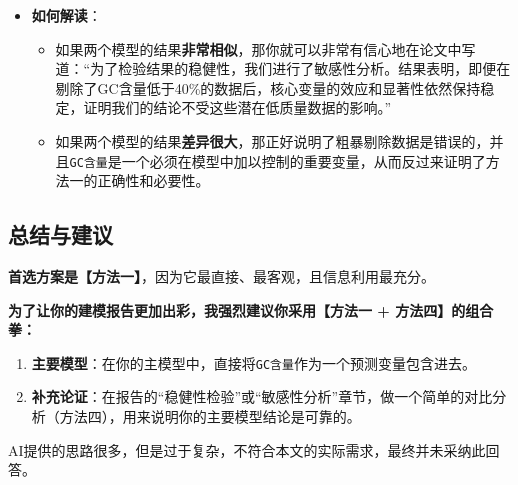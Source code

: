 \documentclass[a4paper, oneside, 12pt]{article}
\newcommand{\aisubsection}[1]{%
    \par\smallskip
    \noindent
    \tcbox[
        on line,
        colback=black!20,
        colframe=black!75,
        fontupper=\bfseries,
        boxsep=2pt,
        left=3pt, right=3pt, top=2pt, bottom=2pt,
        arc=2pt
    ]{#1}
    \par\nopagebreak
}
\begin{document}
\begin{aireport}
{\begin{itemize}
        \item \textbf{如何解读}：
            \begin{itemize}
                \item 如果两个模型的结果\textbf{非常相似}，那你就可以非常有信心地在论文中写道：“为了检验结果的稳健性，我们进行了敏感性分析。结果表明，即便在剔除了GC含量低于40\%的数据后，核心变量的效应和显著性依然保持稳定，证明我们的结论不受这些潜在低质量数据的影响。”
                \item 如果两个模型的结果\textbf{差异很大}，那正好说明了粗暴剔除数据是错误的，并且\texttt{GC含量}是一个必须在模型中加以控制的重要变量，从而反过来证明了方法一的正确性和必要性。
            \end{itemize}
    \end{itemize}

    \subsection*{总结与建议}

    \textbf{首选方案是【方法一】}，因为它最直接、最客观，且信息利用最充分。

    \textbf{为了让你的建模报告更加出彩，我强烈建议你采用【方法一 + 方法四】的组合拳：}

    \begin{enumerate}
        \item \textbf{主要模型}：在你的主模型中，直接将\texttt{GC含量}作为一个预测变量包含进去。
        \item \textbf{补充论证}：在报告的“稳健性检验”或“敏感性分析”章节，做一个简单的对比分析（方法四），用来说明你的主要模型结论是可靠的。
    \end{enumerate}
}

    \aisubsection{采纳和人工修改情况}
    AI提供的思路很多，但是过于复杂，不符合本文的实际需求，最终并未采纳此回答。
    
\end{aireport}
\end{document}
